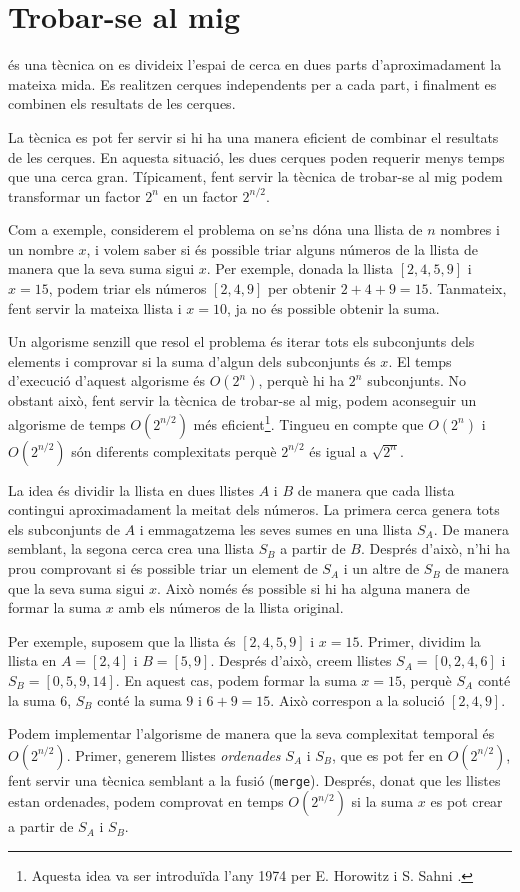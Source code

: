 \section{Trobar-se al mig}


 és una tècnica
on es divideix l'espai de cerca
en dues parts d'aproximadament la mateixa mida.
Es realitzen cerques independents
per a cada part,
i finalment es combinen els resultats de les cerques.

La tècnica es pot fer servir
si hi ha una manera eficient de combinar el
resultats de les cerques.
En aquesta situació, les dues cerques poden requerir menys
temps que una cerca gran.
Típicament, fent servir la tècnica de trobar-se al mig podem
transformar un factor $2^n$ en un factor $2^{n/2}$.

Com a exemple, considerem el problema on
se'ns dóna una llista de $n$ nombres i
un nombre $x$,
i volem saber si és possible
triar alguns números de la llista de manera que
la seva suma sigui $x$.
Per exemple, donada la llista $[2,4,5,9]$ i $x=15$,
podem triar els números $[2,4,9]$ per obtenir $2+4+9=15$.
Tanmateix, fent servir la mateixa llista i $x=10$, ja no
és possible obtenir la suma.

Un algorisme senzill que resol el problema és
iterar tots els subconjunts dels elements i
comprovar si la suma d'algun dels subconjunts és $x$.
El temps d'execució d'aquest algorisme és $O(2^n)$,
perquè hi ha $2^n$ subconjunts.
No obstant això, fent servir la tècnica de trobar-se al mig,
podem aconseguir un algorisme de temps $O(2^{n/2})$ més eficient\footnote{Aquesta idea va ser introduïda l'any 1974 per E. Horowitz
i S. Sahni \cite{hor74}.}.
Tingueu en compte que $O(2^n)$ i $O(2^{n/2})$ són diferents
complexitats perquè $2^{n/2}$ és igual a $\sqrt{2^n}$.

La idea és dividir la llista en
dues llistes $A$ i $B$ de manera que cada llista
contingui aproximadament la meitat dels números.
La primera cerca genera tots els subconjunts
de $A$ i emmagatzema les seves sumes en una llista $S_A$.
De manera semblant, la segona cerca
crea una llista $S_B$ a partir de $B$.
Després d'això, n'hi ha prou comprovant si és possible
triar un element de $S_A$ i un altre
de $S_B$ de manera que la seva suma sigui $x$.
Això només és possible si hi ha alguna manera de formar la suma
$x$ amb els números de la llista original.

Per exemple, suposem que la llista és $[2,4,5,9]$ i $x=15$.
Primer, dividim la llista en $A=[2,4]$ i $B=[5,9]$.
Després d'això, creem llistes
$S_A=[0,2,4,6]$ i $S_B=[0,5,9,14]$.
En aquest cas, podem formar la suma $x=15$,
perquè $S_A$ conté la suma $6$,
$S_B$ conté la suma $9$ i $6+9=15$.
Això correspon a la solució $[2,4,9]$.

Podem implementar l'algorisme de manera que
la seva complexitat temporal és $O(2^{n/2})$.
Primer, generem llistes \emph{ordenades} $S_A$ i $S_B$,
que es pot fer en $O(2^{n/2})$, fent servir una tècnica semblant
a la fusió (\texttt{merge}). Després, donat que les llistes estan
ordenades, podem comprovat en temps $O(2^{n/2})$ si
la suma $x$ es pot crear a partir de $S_A$ i $S_B$.
